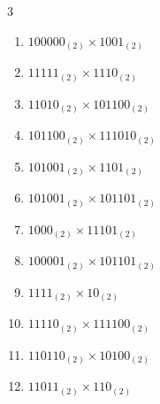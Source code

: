 \begin{multicols}{3}
\begin{enumerate}
  \item $100000_{(2)} \times 1001_{(2)}$


  \item $11111_{(2)} \times 1110_{(2)}$


\columnbreak %

\resetques

  \item $11010_{(2)} \times 101100_{(2)}$


  \item $101100_{(2)} \times 111010_{(2)}$


  \item $101001_{(2)} \times 1101_{(2)}$


  \item $101001_{(2)} \times 101101_{(2)}$


  \item $1000_{(2)} \times 11101_{(2)}$


\columnbreak %

  \item $100001_{(2)} \times 101101_{(2)}$


  \item $1111_{(2)} \times 10_{(2)}$


  \item $11110_{(2)} \times 111100_{(2)}$


  \item $110110_{(2)} \times 10100_{(2)}$


  \item $11011_{(2)} \times 110_{(2)}$


\columnbreak %


\end{enumerate}
\end{multicols}
